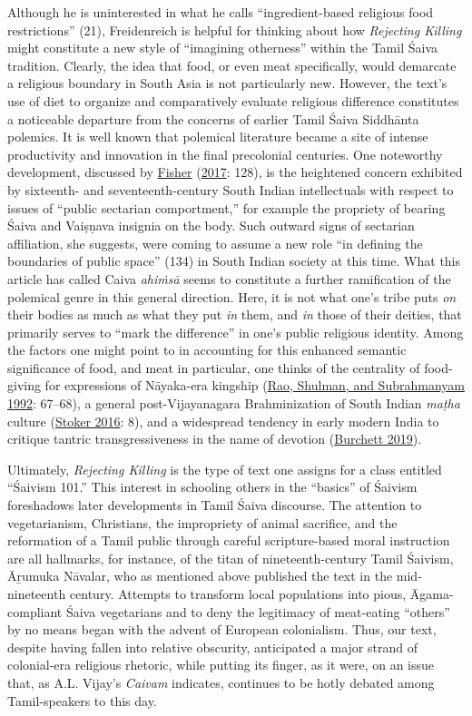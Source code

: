 Although he is uninterested in what he calls “ingredient-based religious food restrictions” (21), Freidenreich is helpful for thinking about how \emph{Rejecting Killing} might constitute a new style of “imagining otherness” within the Tamil Śaiva tradition. Clearly, the idea that food, or even meat specifically, would demarcate a religious boundary in South Asia is not particularly new. However, the text’s use of diet to organize and comparatively evaluate religious difference constitutes a noticeable departure from the concerns of earlier Tamil Śaiva Siddhānta polemics. It is well known that polemical literature became a site of intense productivity and innovation in the final precolonial centuries. One noteworthy development, discussed by \hyperref[Fisher2017]{Fisher} (\hyperref[Fisher2017]{2017}: 128), is the heightened concern exhibited by sixteenth- and seventeenth-century South Indian intellectuals with respect to issues of “public sectarian comportment,” for example the propriety of bearing Śaiva and Vaiṣṇava insignia on the body. Such outward signs of sectarian affiliation, she suggests, were coming to assume a new role “in defining the boundaries of public space” (134) in South Indian society at this time. What this article has called Caiva \emph{ahiṁsā} seems to constitute a further ramification of the polemical genre in this general direction. Here, it is not what one’s tribe puts \emph{on} their bodies as much as what they put \emph{in} them, and \emph{in} those of their deities, that primarily serves to “mark the difference” in one’s public religious identity. Among the factors one might point to in accounting for this enhanced semantic significance of food, and meat in particular, one thinks of the centrality of food-giving for expressions of Nāyaka-era kingship (\hyperref[Rao1992]{Rao, Shulman, and Subrahmanyam 1992}: 67–68), a general post-Vijayanagara Brahminization of South Indian \emph{maṭha} culture (\hyperref[Stoker2016]{Stoker 2016}: 8), and a widespread tendency in early modern India to critique tantric transgressiveness in the name of devotion (\hyperref[Burchett2019]{Burchett 2019}).


Ultimately, \emph{Rejecting Killing} is the type of text one assigns for a class entitled “Śaivism 101.” This interest in schooling others in the “basics” of Śaivism foreshadows later developments in Tamil Śaiva discourse. The attention to vegetarianism, Christians, the impropriety of animal sacrifice, and the reformation of a Tamil public through careful scripture-based moral instruction are all hallmarks, for instance, of the titan of nineteenth-century Tamil Śaivism, Āṟumuka Nāvalar, who as mentioned above published the text in the mid-nineteenth century. Attempts to transform local populations into pious, Āgama-compliant Śaiva vegetarians and to deny the legitimacy of meat-eating “others” by no means began with the advent of European colonialism. Thus, our text, despite having fallen into relative obscurity, anticipated a major strand of colonial-era religious rhetoric, while putting its finger, as it were, on an issue that, as A.\thinskip{}L. Vijay’s \emph{{Caivam}} indicates, continues to be hotly debated among Tamil-speakers to this day.

